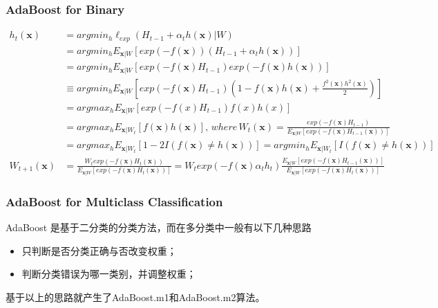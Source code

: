 \documentclass[usenames,dvipsnames]{beamer}
\begin{document}
\begin{frame}
\frametitle{AdaBoost for Binary}
\small{
\begin{align*}
  h_t(\textbf{x})   & = argmin_h \ell_{exp}(H_{t-1}+\alpha_th(\textbf{x})|W) \\
                    & = argmin_h E_{\textbf{x}|W}[exp(-f(\textbf{x}))(H_{t-1}+\alpha_th(\textbf{x}))] \\
                    & = argmin_h E_{\textbf{x}|W}[exp(-f(\textbf{x})H_{t-1})exp(-f(\textbf{x})h(\textbf{x}))]\\
                    & \equiv argmin_h E_{\textbf{x}|W}[exp(-f(\textbf{x})H_{t-1})(1-f(\textbf{x})h(\textbf{x}) + \frac{f^2(\textbf{x})h^2(\textbf{x})}{2})]\\
                    & = argmax_h E_{\textbf{x}|W}[exp(-f(x)H_{t-1})f(x)h(x)] \\
                    & = argmax_h E_{\textbf{x}|W_t}[f(\textbf{x})h(\textbf{x})], \, where\, W_t(\textbf{x}) 
                      = \frac{exp(-f(\textbf{x})H_{t-1})}{E_{\textbf{x}|W}[exp(-f(\textbf{x})H_{t-1}(\textbf{x}))]} \\
                    & = argmax_h E_{\textbf{x}|W_t}[1-2I(f(\textbf{x})\neq h(\textbf{x}))] = argmin_h E_{\textbf{x}|W_t}[I(f(\textbf{x})\neq h(\textbf{x}))]\\
W_{t+1}(\textbf{x}) & = \frac{W_texp(-f(\textbf{x})H_t(\textbf{x}))}{E_{\textbf{x}|W}[exp(-f(\textbf{x})H_t(\textbf{x}))]}
                      = W_texp(-f(\textbf{x})\alpha_th_t)\frac{E_{\textbf{x}|W}[exp(-f(\textbf{x})H_{t-1}(\textbf{x}))]}{E_{\textbf{x}|W}[exp(-f(\textbf{x})H_t(\textbf{x}))]}
\end{align*}
}
\end{frame}
\begin{frame}
\frametitle{AdaBoost for Multiclass Classification}
AdaBoost 是基于二分类的分类方法，而在多分类中一般有以下几种思路
\begin{itemize}
  \item 只判断是否分类正确与否改变权重；
  \item 判断分类错误为哪一类别，并调整权重；
\end{itemize}
基于以上的思路就产生了AdaBoost.m1和AdaBoost.m2算法。
\end{frame}
\end{document}
